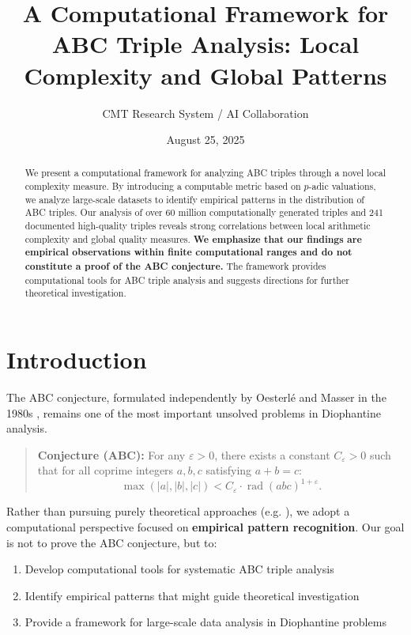 \documentclass[11pt,a4paper]{article}
\title{A Computational Framework for ABC Triple Analysis: Local Complexity and Global Patterns}
\author{CMT Research System / AI Collaboration}
\date{August 25, 2025}
\DeclareMathOperator{\rad}{rad}
\begin{document}
\maketitle

\begin{abstract}
We present a computational framework for analyzing ABC triples through a novel local complexity measure. By introducing a computable metric based on $p$-adic valuations, we analyze large-scale datasets to identify empirical patterns in the distribution of ABC triples. Our analysis of over 60 million computationally generated triples and 241 documented high-quality triples reveals strong correlations between local arithmetic complexity and global quality measures. \textbf{We emphasize that our findings are empirical observations within finite computational ranges and do not constitute a proof of the ABC conjecture.} The framework provides computational tools for ABC triple analysis and suggests directions for further theoretical investigation.
\end{abstract}

\section{Introduction}

The ABC conjecture, formulated independently by Oesterlé and Masser in the 1980s \citep{oesterle1988abc,masser1985abc}, remains one of the most important unsolved problems in Diophantine analysis.

\begin{quote}
\textbf{Conjecture (ABC):} For any $\varepsilon > 0$, there exists a constant $C_\varepsilon > 0$ such that for all coprime integers $a, b, c$ satisfying $a+b=c$:
\[
\max(|a|,|b|,|c|) < C_\varepsilon \cdot \rad(abc)^{1+\varepsilon}.
\]
\end{quote}

Rather than pursuing purely theoretical approaches (e.g. \cite{granville1998abc,szpiro1990discriminant,pollack2005}), we adopt a computational perspective focused on \textbf{empirical pattern recognition}. Our goal is not to prove the ABC conjecture, but to:
\begin{enumerate}
    \item Develop computational tools for systematic ABC triple analysis
    \item Identify empirical patterns that might guide theoretical investigation
    \item Provide a framework for large-scale data analysis in Diophantine problems
\end{enumerate}
\end{document}
